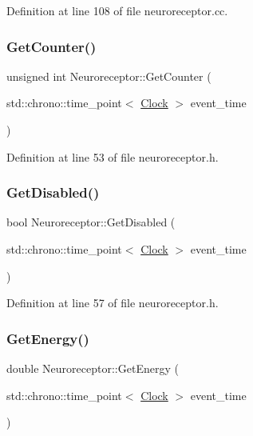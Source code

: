 Definition at line 108 of file neuroreceptor.\+cc.

\mbox{\label{class_neuroreceptor_a4a49cfc2f741d7f7b7888929651f7be3}} 
\subsubsection{\texorpdfstring{Get\+Counter()}{GetCounter()}}
{\footnotesize\ttfamily unsigned int Neuroreceptor\+::\+Get\+Counter (\begin{DoxyParamCaption}\item[{std\+::chrono\+::time\+\_\+point$<$ \mbox{\hyperlink{universe_8h_a0ef8d951d1ca5ab3cfaf7ab4c7a6fd80}{Clock}} $>$}]{event\+\_\+time }\end{DoxyParamCaption})\hspace{0.3cm}{\ttfamily [inline]}}



Definition at line 53 of file neuroreceptor.\+h.

\mbox{\label{class_neuroreceptor_aff4754990dc5b8d0105db281c02031d7}} 
\subsubsection{\texorpdfstring{Get\+Disabled()}{GetDisabled()}}
{\footnotesize\ttfamily bool Neuroreceptor\+::\+Get\+Disabled (\begin{DoxyParamCaption}\item[{std\+::chrono\+::time\+\_\+point$<$ \mbox{\hyperlink{universe_8h_a0ef8d951d1ca5ab3cfaf7ab4c7a6fd80}{Clock}} $>$}]{event\+\_\+time }\end{DoxyParamCaption})\hspace{0.3cm}{\ttfamily [inline]}}



Definition at line 57 of file neuroreceptor.\+h.

\mbox{\label{class_neuroreceptor_abc151381ec5e7c39bb45f87a9fd17b9a}} 
\subsubsection{\texorpdfstring{Get\+Energy()}{GetEnergy()}}
{\footnotesize\ttfamily double Neuroreceptor\+::\+Get\+Energy (\begin{DoxyParamCaption}\item[{std\+::chrono\+::time\+\_\+point$<$ \mbox{\hyperlink{universe_8h_a0ef8d951d1ca5ab3cfaf7ab4c7a6fd80}{Clock}} $>$}]{event\+\_\+time }\end{DoxyParamCaption})\hspace{0.3cm}{\ttfamily [inline]}}



